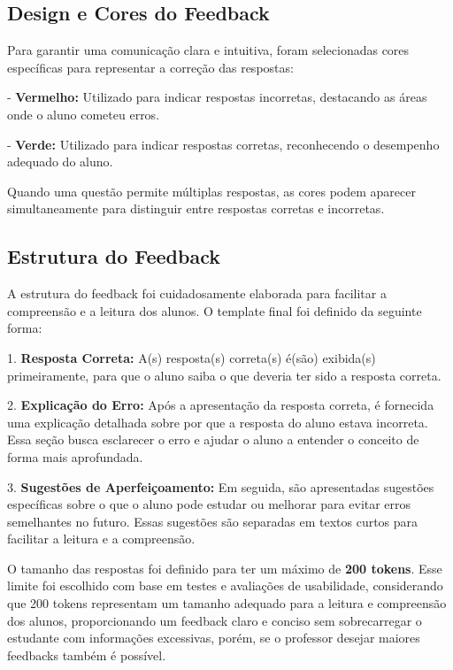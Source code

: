 \subsection{Design e Cores do Feedback}

Para garantir uma comunicação clara e intuitiva, foram selecionadas cores específicas para representar a correção das respostas:

- \textbf{Vermelho:} Utilizado para indicar respostas incorretas, destacando as áreas onde o aluno cometeu erros.

- \textbf{Verde:} Utilizado para indicar respostas corretas, reconhecendo o desempenho adequado do aluno.

Quando uma questão permite múltiplas respostas, as cores podem aparecer simultaneamente para distinguir entre respostas corretas e incorretas.

\subsection{Estrutura do Feedback}

A estrutura do feedback foi cuidadosamente elaborada para facilitar a compreensão e a leitura dos alunos. O template final foi definido da seguinte forma:

1. \textbf{Resposta Correta:} A(s) resposta(s) correta(s) é(são) exibida(s) primeiramente, para que o aluno saiba o que deveria ter sido a resposta correta.

2. \textbf{Explicação do Erro:} Após a apresentação da resposta correta, é fornecida uma explicação detalhada sobre por que a resposta do aluno estava incorreta. Essa seção busca esclarecer o erro e ajudar o aluno a entender o conceito de forma mais aprofundada.

3. \textbf{Sugestões de Aperfeiçoamento:} Em seguida, são apresentadas sugestões específicas sobre o que o aluno pode estudar ou melhorar para evitar erros semelhantes no futuro. Essas sugestões são separadas em textos curtos para facilitar a leitura e a compreensão.

O tamanho das respostas foi definido para ter um máximo de \textbf{200 tokens}. Esse limite foi escolhido com base em testes e avaliações de usabilidade, considerando que 200 tokens representam um tamanho adequado para a leitura e compreensão dos alunos, proporcionando um feedback claro e conciso sem sobrecarregar o estudante com informações excessivas, porém, se o professor desejar maiores feedbacks também é possível.

